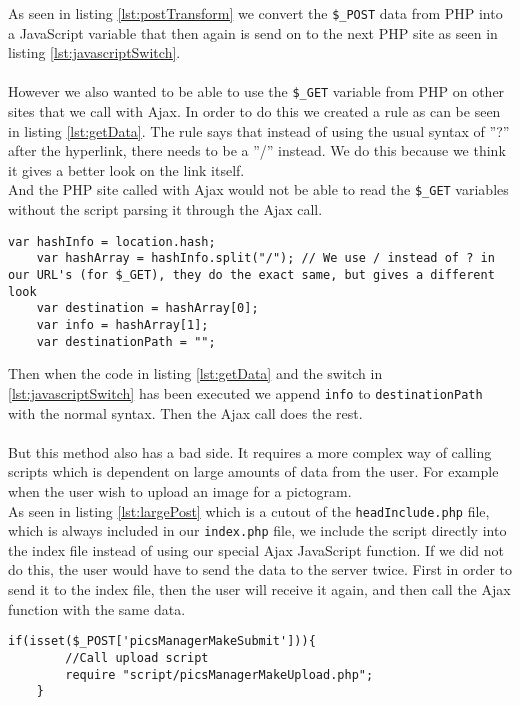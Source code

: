 As seen in listing \ref{lst:postTransform} we convert the \texttt{\$\_POST} data from PHP into a JavaScript variable that then again is send on to the next PHP site as seen in listing \ref{lst:javascriptSwitch}.\\
\\
However we also wanted to be able to use the \texttt{\$\_GET} variable from PHP on other sites that we call with Ajax. In order to do this we created a rule as can be seen in listing \ref{lst:getData}. The rule says that instead of using the usual syntax of ''?'' after the hyperlink, there needs to be a ''/'' instead. We do this because we think it gives a better look on the link itself.\\
And the PHP site called with Ajax would not be able to read the \texttt{\$\_GET} variables without the script parsing it through the Ajax call.

\lstset{language=Java}
\begin{lstlisting}[firstline=1,caption={The GET transform code},label=lst:getData]
    var hashInfo = location.hash;    
	var hashArray = hashInfo.split("/"); // We use / instead of ? in our URL's (for $_GET), they do the exact same, but gives a different look
	var destination = hashArray[0];
	var info = hashArray[1];
	var destinationPath = "";
\end{lstlisting}

Then when the code in listing \ref{lst:getData} and the switch in \ref{lst:javascriptSwitch} has been executed we append \texttt{info} to \texttt{destinationPath} with the normal syntax. Then the Ajax call does the rest.\\
\\
But this method also has a bad side. It requires a more complex way of calling scripts which is dependent on large amounts of data from the user. For example when the user wish to upload an image for a pictogram.\\
As seen in listing \ref{lst:largePost} which is a cutout of the \texttt{headInclude.php} file, which is always included in our \texttt{index.php} file, we include the script directly into the index file instead of using our special Ajax JavaScript function. If we did not do this, the user would have to send the data to the server twice. First in order to send it to the index file, then the user will receive it again, and then call the Ajax function with the same data.\\

\lstset{language=PHP}
\begin{lstlisting}[firstline=1,caption={The handling of big PHP POSTs},label=lst:largePost]
	if(isset($_POST['picsManagerMakeSubmit'])){
		//Call upload script
		require "script/picsManagerMakeUpload.php";
	}
\end{lstlisting}

